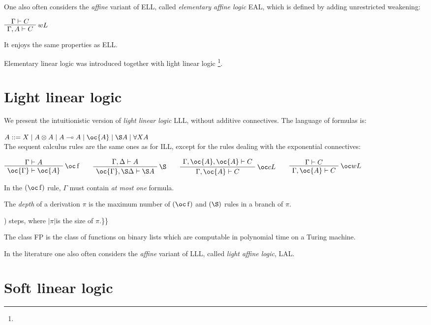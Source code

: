 One also often considers the \emph{affine} variant of ELL, called
\emph{elementary affine logic} EAL, which is defined by adding
unrestricted weakening:

\(\AxRule{\Gamma\vdash C}
\LabelRule{ w L}
\UnaRule{\Gamma,A\vdash C}
\DisplayProof\)

It enjoys the same properties as ELL.

Elementary linear logic was introduced together with light linear logic
\footnote{}.


\section{Light linear logic}\label{light-linear-logic}

We present the intuitionistic version of \emph{light linear logic} LLL,
without additive connectives. The language of formulas is:

\(A ::= X \mid A\tens A \mid A\limp A  \mid \oc{A} \mid \pg{A} \mid \forall X A\)\\
The sequent calculus rules are the same ones as for ILL, except for the
rules dealing with the exponential connectives:

\(\AxRule{\Gamma\vdash A}
\LabelRule{\oc\rulename{f} }
\UnaRule{\oc{\Gamma}\vdash\oc{A}}
\DisplayProof
\qquad
\AxRule{\Gamma, \Delta\vdash A}
\LabelRule{\pg }
\UnaRule{\oc{\Gamma}, \pg \Delta\vdash\pg{A}}
\DisplayProof
\qquad
\AxRule{\Gamma,\oc{A},\oc{A}\vdash C}
\LabelRule{\oc c L}
\UnaRule{\Gamma,\oc{A}\vdash C}
\DisplayProof
\qquad
\AxRule{\Gamma\vdash C}
\LabelRule{\oc w L}
\UnaRule{\Gamma,\oc{A}\vdash C}
\DisplayProof\)

In the \((\oc\rulename{f})\) rule, \(\Gamma\) must contain \emph{at most
one} formula.

The \emph{depth} of a derivation \(\pi\) is the maximum number of
\((\oc\rulename{f})\) and \((\pg)\) rules in a branch of \(\pi\).

) steps, where \(|\pi|\)is the size of \(\pi\).\}\}

The class FP is the class of functions on binary lists which are
computable in polynomial time on a Turing machine.

In the literature one also often considers the \emph{affine} variant of
LLL, called \emph{light affine logic}, LAL.

\section{Soft linear logic}\label{soft-linear-logic}

